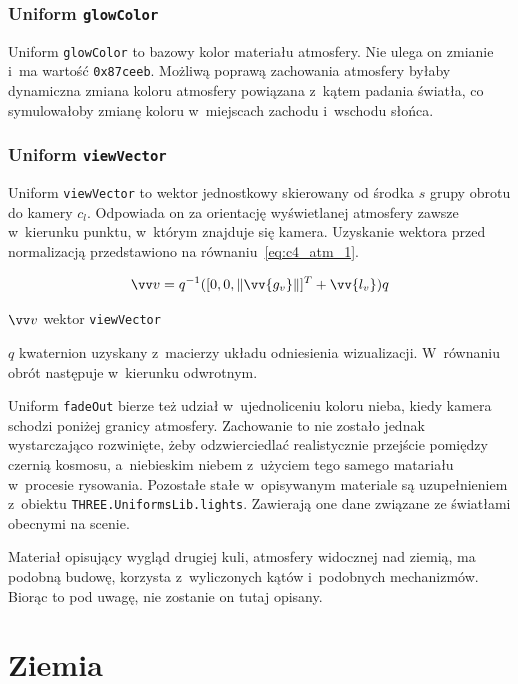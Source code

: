 \subsubsection{Uniform \texttt{glowColor}}
Uniform \texttt{glowColor} to bazowy kolor materiału atmosfery. Nie ulega on zmianie i~ma wartość \texttt{0x87ceeb}. Możliwą poprawą zachowania atmosfery byłaby dynamiczna zmiana koloru atmosfery powiązana z~kątem padania światła, co symulowałoby zmianę koloru w~miejscach zachodu i~wschodu słońca.

\subsubsection{Uniform \texttt{viewVector}}
Uniform \texttt{viewVector} to wektor jednostkowy skierowany od środka $s$ grupy obrotu do kamery $c_l$. Odpowiada on za orientację wyświetlanej atmosfery zawsze w~kierunku punktu, w~którym znajduje się kamera. Uzyskanie wektora przed normalizacją przedstawiono na równaniu~\ref{eq:c4_atm_1}.

\begin{equation}
  \label{eq:c4_atm_1}
  \vv v = q^{-1}([0, 0, \length{\vv{g_v}}]^T + \vv{l_v})q
\end{equation}
\begin{eqexpl}[25mm]
\item {$\vv v$} wektor \texttt{viewVector}
\item {$q$} kwaternion uzyskany z~macierzy układu odniesienia wizualizacji. W~równaniu obrót następuje w~kierunku odwrotnym.
\end{eqexpl}

Uniform \texttt{fadeOut} bierze też udział w~ujednoliceniu koloru nieba, kiedy kamera schodzi poniżej granicy atmosfery. Zachowanie to nie zostało jednak wystarczająco rozwinięte, żeby odzwierciedlać realistycznie przejście pomiędzy czernią kosmosu, a~niebieskim niebem z~użyciem tego samego matariału w~procesie rysowania. Pozostałe stałe w~opisywanym materiale są uzupełnieniem z~obiektu \mbox{\texttt{THREE.UniformsLib.lights}}. Zawierają one dane związane ze światłami obecnymi na scenie. 

Materiał opisujący wygląd drugiej kuli, atmosfery widocznej nad ziemią, ma podobną budowę, korzysta z~wyliczonych kątów i~podobnych mechanizmów. Biorąc to pod uwagę, nie zostanie on tutaj opisany. 

\section{Ziemia}

